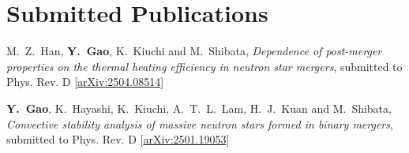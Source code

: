 \newcommand{\arxiv}[1]{[\href{http://arxiv.org/abs/#1}{arXiv:#1}]}
\newcommand{\citeCount}[1]{(#1 citations)}
\renewcommand{\citeCount}[1]{}


\setcounter{numPubs}{26}
\setcounter{pubCounter}{\value{numPubs}}

\section{\sc Submitted Publications}
\begin{etaremune}[start=\value{pubCounter}]
  \item
  M.~Z.~Han, {\bf Y.~Gao}, K.~Kiuchi and M.~Shibata,
  {\it Dependence of post-merger properties on the thermal heating efficiency in neutron star mergers},
  submitted to Phys. Rev. D
  \arxiv{2504.08514}
  \item
  {\bf Y.~Gao}, K.~Hayashi, K.~Kiuchi, A.~T.~L.~Lam, H.~J.~Kuan and M.~Shibata,
  {\it Convective stability analysis of massive neutron stars formed in binary mergers},
  submitted to Phys. Rev. D
  \arxiv{2501.19053}
\end{etaremune}



